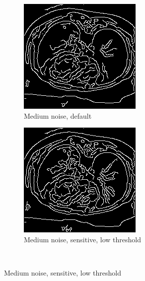 \begin{figure}[H]
  \centering
  
  \begin{subfigure}{.5\textwidth}
    \centering
    \includegraphics[width=.9\textwidth]{./edgedetection/medium_noise/m_noise_def}
    \caption{Medium noise, default}
    \label{fig:m_noise_def}
  \end{subfigure}%
  
  \begin{subfigure}{.5\textwidth}
    \centering
    \includegraphics[width=.9\textwidth]{./edgedetection/medium_noise/m_noise_sens_l_thres}
    \caption{Medium noise, sensitive, low threshold}
    \label{fig:m_noise_sens_l_thres}
  \end{subfigure}\\%
  

\end{figure}
